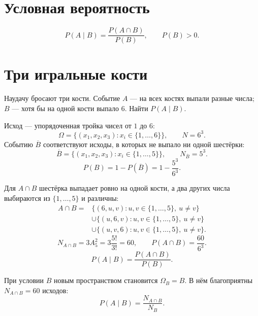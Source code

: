 


\section*{Условная вероятность}
\[
 P(A\mid B)=\frac{P(A\cap B)}{P(B)},\qquad P(B)>0.
\]

\section*{Три игральные кости}
Наудачу бросают три кости. Событие $A$ --- на всех костях выпали разные числа;
$B$ --- хотя бы на одной кости выпало $6$. Найти $P(A\mid B)$.

Исход --- упорядоченная тройка чисел от $1$ до $6$:
\[
 \Omega=\{(x_1,x_2,x_3):x_i\in\{1,\ldots,6\}\},\qquad N=6^3.
\]
Событию $\overline B$ соответствуют исходы, в которых не выпало ни одной шестёрки:
\[
 \overline B=\{(x_1,x_2,x_3):x_i\in\{1,\ldots,5\}\},\qquad
 N_{\overline B}=5^3.
\]
\[
 P(B)=1-P(\overline B)=1-\frac{5^3}{6^3}.
\]

Для $A\cap B$ шестёрка выпадает ровно на одной кости, а два других числа
выбираются из $\{1,\ldots,5\}$ и различны:
\begin{align*}
 A\cap B={}&\{(6,u,v):u,v\in\{1,\ldots,5\},\ u\ne v\}\\
 &\cup\{(u,6,v):u,v\in\{1,\ldots,5\},\ u\ne v\}\\
 &\cup\{(u,v,6):u,v\in\{1,\ldots,5\},\ u\ne v\}.
\end{align*}
\[
 N_{A\cap B}=3A_5^2=3\frac{5!}{3!}=60,\qquad
 P(A\cap B)=\frac{60}{6^3}.
\]
\[
 P(A\mid B)=\frac{P(A\cap B)}{P(B)}.
\]

При условии $B$ новым пространством становится $\Omega_B=B$.
В нём благоприятны $N_{A\cap B}=60$ исходов:
\[
 P(A\mid B)=\frac{N_{A\cap B}}{N_B}.
\]
\begin{center}
\end{center}

